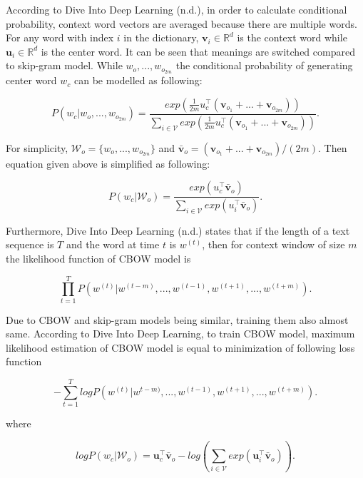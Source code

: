 \documentclass[man]{apa7}
\begin{document}
According to Dive Into Deep Learning (n.d.), in order to calculate conditional probability, context word vectors are averaged because there are multiple words. For any word with index $i$ in the dictionary, $\mathbf{v_\mathit{i}} \in \mathbb{R}^d$ is the context word while $\mathbf{u_\mathit{i}} \in \mathbb{R}^d$  is the center word. It can be seen that meanings are switched compared to skip-gram model. While $w_o,...,w_{o_{2m}}$ the conditional probability of generating center word $w_c$ can be modelled as following:

\begin{equation}
P(w_c|w_o,...,w_{o_{2m}}) = \frac{exp(\frac{1}{2m}u_c^\top(\mathbf{v}_{o_1}+...+\mathbf{v}_{o_{2m}}))}{\sum_{i \in \mathcal{V}} exp(\frac{1}{2m}u_c^\top(\mathbf{v}_{o_1}+...+\mathbf{v}_{o_{2m}}))}.
\end{equation}

For simplicity, $\mathcal{W}_o = \{ w_o,...,w_{o_{2m}}\}$ and $\bar{\mathbf{v}}_o = (\mathbf{v}_{o_1}+...+\mathbf{v}_{o_{2m}})/(2m)$. Then equation given above is simplified as following:

\begin{equation}
P(w_c | \mathcal{W}_o) = \frac{exp(u_c^\top \bar{\mathbf{v}}_o)}{\sum_{i \in \mathcal{V}} exp(u_i^\top \bar{\mathbf{v}}_o)}.
\end{equation}

Furthermore, Dive Into Deep Learning (n.d.) states that if the length of a text sequence is $\mathit{T}$ and the word at time $t$ is $w^{(t)}$, then for context window of size $m$ the likelihood function of CBOW model is

\begin{equation}
\prod_{t=1}^T P(w^{(t)}| w^{(t-m)},..., w^{(t-1)},w^{(t+1)},...,w^{(t+m)}).
\end{equation}

Due to CBOW and skip-gram models being similar, training them also almost same. According to Dive Into Deep Learning, to train CBOW model, maximum likelihood estimation of CBOW model is equal to minimization of following loss function

\begin{equation}
- \sum_{t=1}^T logP(w^{(t)} | w^{t-m)} ,..., w^{(t-1)} ,w^{(t+1)}, ...,w^{(t+m)}).
\end{equation}

where

\begin{equation}
logP(w_c | \mathcal{W}_o) = \mathbf{u}_c^\top \bar{\mathbf{v}}_o - log(\sum_{i \in \mathcal{V}} exp(\mathbf{u}_i^\top \bar{\mathbf{v}}_o)).
\end{equation}
\end{document}
